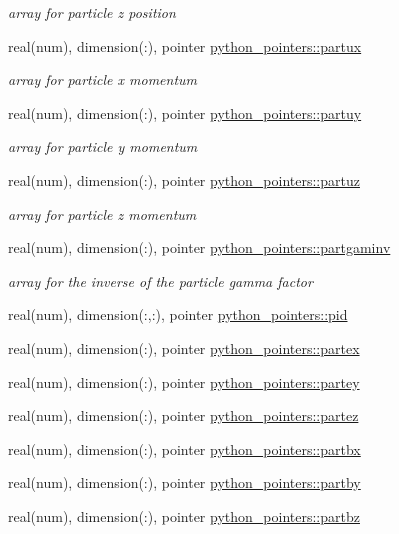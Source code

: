 \begin{DoxyCompactItemize}
$$\begin{DoxyCompactList}\small\item\em array for particle z position \end{DoxyCompactList}\item 
real(num), dimension(\+:), pointer \hyperlink{namespacepython__pointers_a733cff77ba19e5a06a73224fe9f53542}{python\+\_\+pointers\+::partux}
\begin{DoxyCompactList}\small\item\em array for particle x momentum \end{DoxyCompactList}\item 
real(num), dimension(\+:), pointer \hyperlink{namespacepython__pointers_a60b173a25b047377d55cd66dfb5fad04}{python\+\_\+pointers\+::partuy}
\begin{DoxyCompactList}\small\item\em array for particle y momentum \end{DoxyCompactList}\item 
real(num), dimension(\+:), pointer \hyperlink{namespacepython__pointers_a98c8cf1649933f3239b068104d637d6c}{python\+\_\+pointers\+::partuz}
\begin{DoxyCompactList}\small\item\em array for particle z momentum \end{DoxyCompactList}\item 
real(num), dimension(\+:), pointer \hyperlink{namespacepython__pointers_a072266fc5f086ac68bdb72332b296a07}{python\+\_\+pointers\+::partgaminv}
\begin{DoxyCompactList}\small\item\em array for the inverse of the particle gamma factor \end{DoxyCompactList}\item 
real(num), dimension(\+:,\+:), pointer \hyperlink{namespacepython__pointers_a8a754456a1a3440c897f9a6249782713}{python\+\_\+pointers\+::pid}
\item 
real(num), dimension(\+:), pointer \hyperlink{namespacepython__pointers_ad4fc57017cff184e92ae60ff0006c62c}{python\+\_\+pointers\+::partex}
\item 
real(num), dimension(\+:), pointer \hyperlink{namespacepython__pointers_af358e4be4f10aeff30df94181589c382}{python\+\_\+pointers\+::partey}
\item 
real(num), dimension(\+:), pointer \hyperlink{namespacepython__pointers_a61f858897e873f37d7bb3e355e2b9740}{python\+\_\+pointers\+::partez}
\item 
real(num), dimension(\+:), pointer \hyperlink{namespacepython__pointers_a9de58f9a1f88381cac4457014ee8859f}{python\+\_\+pointers\+::partbx}
\item 
real(num), dimension(\+:), pointer \hyperlink{namespacepython__pointers_aab1fc483934951de61c30198fa476e40}{python\+\_\+pointers\+::partby}
\item 
real(num), dimension(\+:), pointer \hyperlink{namespacepython__pointers_a9c50a4b64ff01114243eebc0dc729ae8}{python\+\_\+pointers\+::partbz}
\end{DoxyCompactItemize}

